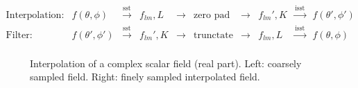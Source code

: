 \begin{equation}
\begin{array}{cccccccccc}
\textrm{Interpolation:} & f(\theta,\phi) & \stackrel{\textrm{sst}}{\rightarrow} & f_{lm}, L & \rightarrow & \textrm{zero pad} &\rightarrow & f_{lm}', K & \stackrel{\textrm{isst}}{\rightarrow} & f(\theta',\phi') \nonumber \\
\textrm{Filter:} & f(\theta',\phi') & \stackrel{\textrm{sst}}{\rightarrow} & f_{lm}', K & \rightarrow & \textrm{trunctate} &\rightarrow & f_{lm}, L &\stackrel{\textrm{isst}}{\rightarrow} & f(\theta,\phi) \nonumber \\
\end{array}
\end{equation}

%
%


 \begin{figure}[H] 
 \centering
{} 
\caption{Interpolation of a complex scalar field (real part). Left: coarsely sampled field. Right: finely sampled interpolated field. }
\end{figure}

